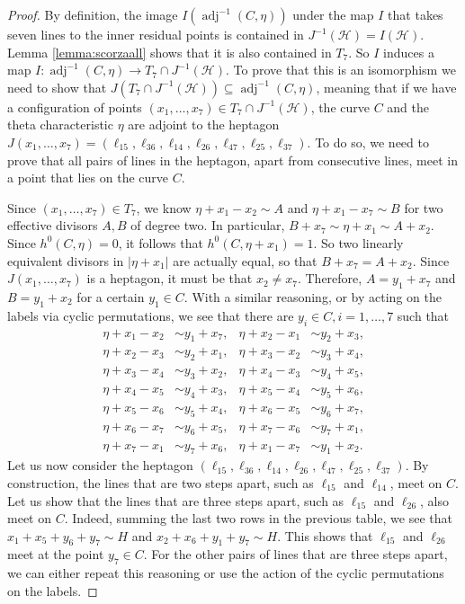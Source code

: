 \documentclass[12pt]{article}
\numberwithin{equation}{section}
\theoremstyle{definition}
\DeclareMathOperator{\adj}{adj}
\begin{document}
\begin{proof}
	By definition, the image $I(\adj^{-1}(C,\eta))$ under the map $I$ that takes seven lines to the inner residual points is contained in $J^{-1}(\mathcal{H})=I(\mathcal{H})$. Lemma \ref{lemma:scorzaall} shows that it is also contained in $T_7$. So $I$ induces a map $I\colon \adj^{-1}(C,\eta) \to T_7\cap J^{-1}(\mathcal{H})$. To prove that this is an isomorphism we need to show that $J(T_7\cap J^{-1}(\mathcal{H})) \subseteq \adj^{-1}(C,\eta)$, meaning that if we have a configuration of points $(x_1,\dots,x_7) \in T_7\cap J^{-1}(\mathcal{H})$, the curve $C$ and the theta characteristic $\eta$ are adjoint to the heptagon $J(x_1,\dots,x_7) = (\ell_{15},\ell_{36},\ell_{14},\ell_{26},\ell_{47},\ell_{25},\ell_{37})$. To do so, we need to prove that all pairs of lines in the heptagon, apart from consecutive lines, meet in a point that lies on the curve $C$.
	
	Since $(x_1,\dots,x_7)\in T_7$, we know $\eta+x_1-x_2 \sim A$ and $\eta+x_1-x_7\sim B$ for two effective divisors $A,B$ of degree two. In particular, $B+x_7 \sim \eta+x_1 \sim A+x_2$. Since $h^0(C,\eta)=0$, it follows that $h^0(C,\eta+x_1)=1$. So two linearly equivalent divisors in $|\eta+x_1|$ are actually equal, so that $B+x_7 = A+x_2$. Since $J(x_1,\dots,x_7)$ is a heptagon, it must be that $x_2\ne x_7$. Therefore, $A = y_1+x_7$ and $B=y_1+x_2$ for a certain $y_1\in C$. With a similar reasoning, or by acting on the labels via cyclic permutations, we see that there are $y_i\in C,i=1,\dots,7$ such that
	\begin{align*}
	\eta+x_1-x_2 &\sim y_1 + x_7, & \eta+x_2-x_1 &\sim y_2 + x_3, \\
	\eta+x_2-x_3 &\sim y_2 + x_1, & \eta+x_3-x_2 &\sim y_3 + x_4, \\
	\eta+x_3-x_4 &\sim y_3 + x_2, & \eta+x_4-x_3 &\sim y_4 + x_5, \\
	\eta+x_4-x_5 &\sim y_4 + x_3, & \eta+x_5-x_4 &\sim y_5 + x_6, \\
	\eta+x_5-x_6 &\sim y_5 + x_4, & \eta+x_6-x_5 &\sim y_6 + x_7, \\
	\eta+x_6-x_7 &\sim y_6 + x_5, & \eta+x_7-x_6 &\sim y_7 + x_1, \\
	\eta+x_7-x_1 &\sim y_7 + x_6, & \eta+x_1-x_7 &\sim y_1 + x_2. 
	\end{align*}
	 Let us now consider the heptagon $(\ell_{15},\ell_{36},\ell_{14},\ell_{26},\ell_{47},\ell_{25},\ell_{37})$. By construction, the lines that are two steps apart, such as $\ell_{15}$ and $\ell_{14}$, meet on $C$. Let us show that the lines that are three steps apart, such as $\ell_{15}$ and $\ell_{26}$, also meet on $C$. Indeed, summing the last two rows in the previous table, we see that $x_1+x_5+y_6+y_7 \sim H$ and $x_2+x_6+y_1+y_7\sim H$. This shows that $\ell_{15}$ and $\ell_{26}$ meet at the point $y_7\in C$. For the other pairs of lines that are three steps apart, we can either repeat this reasoning or use the action of the cyclic permutations on the labels.
	 

\end{proof}
\end{document}
